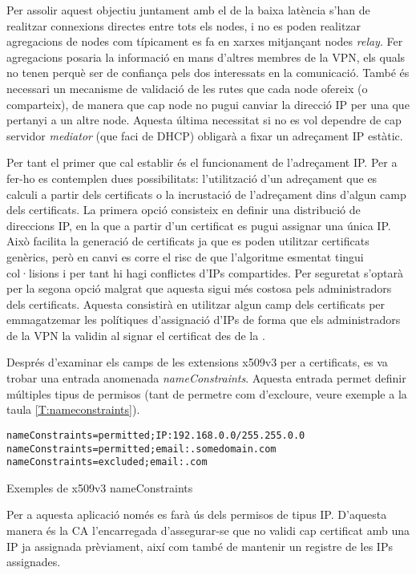 Per assolir aquest objectiu juntament amb el de la baixa latència s'han de realitzar connexions directes entre tots els nodes, i no es poden realitzar agregacions de nodes com típicament es fa en xarxes  mitjançant nodes \emph{relay}. Fer agregacions posaria la informació en mans d'altres membres de la VPN, els quals no tenen perquè ser de confiança pels dos interessats en la comunicació. També és necessari un mecanisme de validació de les rutes que cada node ofereix (o comparteix), de manera que cap node no pugui canviar la direcció IP per una que pertanyi a un altre node. Aquesta última necessitat si no es vol dependre de cap servidor \emph{mediator} (que faci de DHCP) obligarà a fixar un adreçament IP estàtic.

Per tant el primer que cal establir és el funcionament de l'adreçament IP. Per a fer-ho es contemplen dues possibilitats: l'utilització d'un adreçament que es calculi a partir dels certificats o la incrustació de l'adreçament dins d'algun camp dels certificats.
La primera opció consisteix en definir una distribució de direccions IP, en la que a partir d'un certificat es pugui assignar una única IP. Això facilita la generació de certificats ja que es poden utilitzar certificats genèrics, però en canvi es corre el risc de que l'algoritme esmentat tingui col·lisions i per tant hi hagi conflictes d'IPs compartides. Per seguretat s'optarà per la segona opció malgrat que aquesta sigui més costosa pels administradors dels certificats. Aquesta consistirà en utilitzar algun camp dels certificats per emmagatzemar les polítiques d'assignació d'IPs de forma que els administradors de la VPN la validin al signar el certificat des de la .

Després d'examinar els camps de les extensions x509v3 per a certificats, es va trobar una entrada anomenada \emph{nameConstraints}. Aquesta entrada permet definir múltiples tipus de permisos (tant de permetre com d'excloure, veure exemple a la taula \ref{T:nameconstraints}).
\begin{table}[htb]
\begin{center}
\begin{minipage}[htb]{0.6\linewidth}
\footnotesize
\begin{verbatim}
nameConstraints=permitted;IP:192.168.0.0/255.255.0.0
nameConstraints=permitted;email:.somedomain.com
nameConstraints=excluded;email:.com
\end{verbatim}
\end{minipage}
\caption{Exemples de x509v3 nameConstraints}
\label{T:nameconstraints}
\end{center}
\end{table}
Per a aquesta aplicació només es farà ús dels permisos de tipus IP. D'aquesta manera és la CA l'encarregada d'assegurar-se que no validi cap certificat amb una IP ja assignada prèviament, així com també de mantenir un registre de les IPs assignades.

